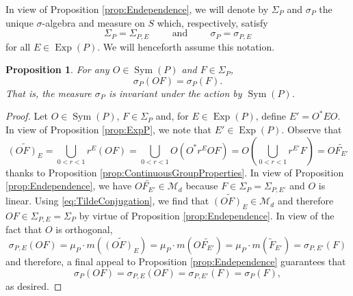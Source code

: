 \documentclass[11pt]{article}
\newtheorem{proposition}[theorem]{Proposition}
\theoremstyle{remark}
\newcommand\Sym{\operatorname{Sym}}
\newcommand\Exp{\operatorname{Exp}}
\begin{document}
\noindent In view of Proposition \ref{prop:Endependence}, we will denote by $\Sigma_P$ and $\sigma_P$ the unique $\sigma$-algebra and measure on $S$ which, respectively, satisfy
\begin{equation*}
    \Sigma_P=\Sigma_{P,E}\hspace{1cm}\mbox{and}\hspace{1cm}\sigma_P=\sigma_{P,E}
\end{equation*}
for all $E\in\Exp(P)$. We will henceforth assume this notation. 



\begin{proposition}\label{prop:SymInvariance}
For any $O\in\Sym(P)$ and $F\in\Sigma_P$,
\begin{equation*}
\sigma_P(O F)=\sigma_P(F).
\end{equation*} 
That is, the measure $\sigma_P$ is invariant under the action by $\Sym(P)$. 
\end{proposition}



\begin{proof}
Let $O\in\Sym(P)$, $F\in\Sigma_P$ and, for $E\in \Exp(P)$, define $E'=O^* EO$. In view of Proposition \ref{prop:ExpP}, we note that $E'\in \Exp(P)$. Observe that
\begin{equation}\label{eq:TildeConjugation}
    \widetilde{(OF)_E}=\bigcup_{0<r<1}r^E (OF)=\bigcup_{0<r<1}O\left(O^* r^E O F\right)=O\left(\bigcup_{0<r<1} r^{E'}F\right)=O \widetilde{F_{E'}}
\end{equation}
thanks to Proposition \ref{prop:ContinuousGroupProperties}.
In view of Proposition \ref{prop:Endependence}, we have $O\widetilde{F_{E'}}\in \mathcal{M}_d$ because $F\in \Sigma_P=\Sigma_{P,E'}$ and $O$ is linear. Using \eqref{eq:TildeConjugation}, we find that $\widetilde{(OF)_E}\in\mathcal{M}_d$ and therefore  $OF\in\Sigma_{P,E}=\Sigma_P$ by virtue of Proposition \ref{prop:Endependence}. In view of the fact that $O$ is orthogonal,
\begin{equation*}
\sigma_{P,E}(OF)=\mu_P\cdot m\left(\widetilde{(OF)_E}\right)=\mu_P\cdot m\left(O \widetilde{F_{E'}}\right)=\mu_P\cdot m\left(\widetilde{F}_{E'}\right)=\sigma_{P,E'}(F)
\end{equation*}
and therefore, a final appeal to Proposition \ref{prop:Endependence} guarantees that
\begin{equation*}
    \sigma_P(OF)=\sigma_{P,E}(OF)=\sigma_{P,E'}(F)=\sigma_P(F),
\end{equation*}
as desired.
\end{proof}
\end{document}
